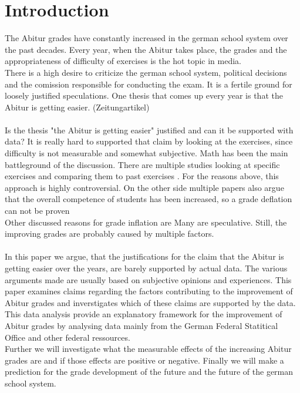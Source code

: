 \section{Introduction}
The Abitur grades have constantly increased in the german school system over the past decades. Every year, when the Abitur takes place, the grades and the appropriateness of difficulty of exercises is the hot topic in media. \\
There is a high desire to criticize the german school system, political decisions and the comission responsible for conducting the exam. It is a fertile ground for loosely justified speculations. One thesis that comes up every year is that the Abitur is getting easier. (Zeitungartikel)\\\\
Is the thesis "the Abitur is getting easier" justified and can it be supported with data? It is really hard to supported that claim by looking at the exercises, since difficulty is not measurable and somewhat subjective. Math has been the main battleground of the discussion. There are multiple studies looking at specific exercises and comparing them to past exercises \cite{kuhnel2015modellierungskompetenz} \cite{JahnkeKleinKühnelSonarSpindler+2014+115+122} \cite{lemmermeyer2019zentralabitur}. For the reasons above, this approach is highly controversial. On the other side multiple papers also argue that the overall competence of students has been increased, so a grade deflation can not be proven \cite{Schleithoff+2015+3+26}\\ Other discussed reasons for grade inflation are Many are speculative. Still, the improving grades are probably caused by multiple factors.\\\\
In this paper we argue, that the justifications for the claim that the Abitur is getting easier over the years, are barely supported by actual data. The various arguments made are usually based on subjective opinions and experiences.
This paper examines claims regarding the factors contributing to the improvement of Abitur grades and inverstigates which of these claims are supported by the data. This data analysis provide an explanatory framework for the improvement of Abitur grades by analysing data mainly from the German Federal Statitical Office and other federal ressources.\\
Further we will investigate what the measurable effects of the increasing Abitur grades are and if those effects are positive or negative. Finally we will make a prediction for the grade development of the future and the future of the german school system.
